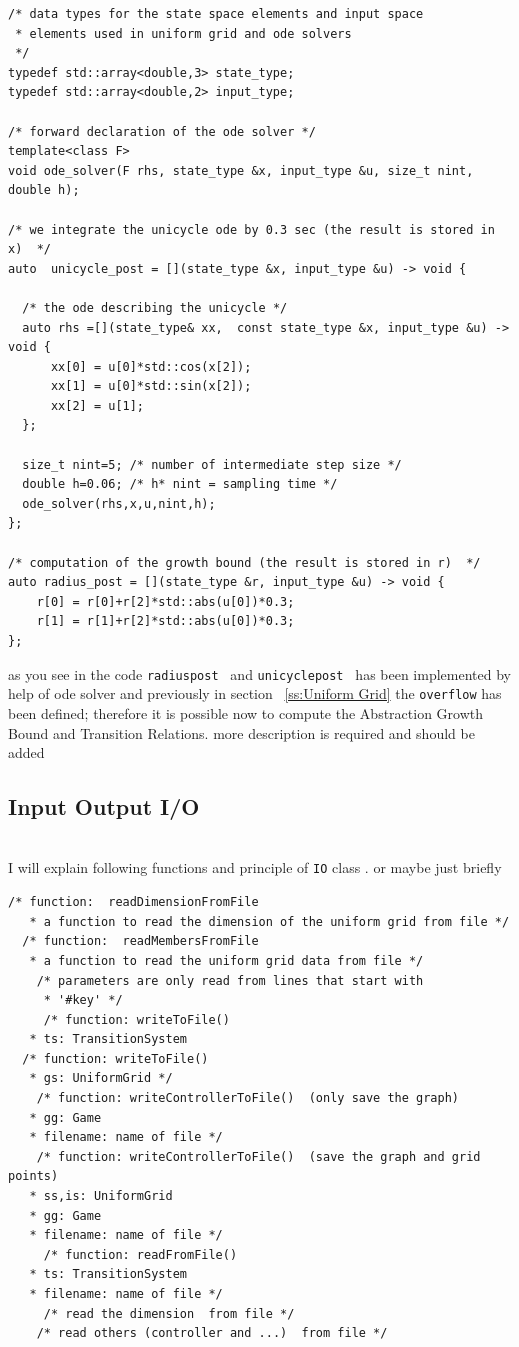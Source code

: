 \documentclass[a4paper]{amsart}
\begin{document}
\begin{lstlisting}[basicstyle=\footnotesize\ttfamily]
/* data types for the state space elements and input space
 * elements used in uniform grid and ode solvers 
 */
typedef std::array<double,3> state_type;
typedef std::array<double,2> input_type;

/* forward declaration of the ode solver */
template<class F>
void ode_solver(F rhs, state_type &x, input_type &u, size_t nint, double h);

/* we integrate the unicycle ode by 0.3 sec (the result is stored in x)  */
auto  unicycle_post = [](state_type &x, input_type &u) -> void {

  /* the ode describing the unicycle */
  auto rhs =[](state_type& xx,  const state_type &x, input_type &u) -> void {
      xx[0] = u[0]*std::cos(x[2]);
      xx[1] = u[0]*std::sin(x[2]);
      xx[2] = u[1];
  };

  size_t nint=5; /* number of intermediate step size */
  double h=0.06; /* h* nint = sampling time */
  ode_solver(rhs,x,u,nint,h);
};

/* computation of the growth bound (the result is stored in r)  */
auto radius_post = [](state_type &r, input_type &u) -> void {
    r[0] = r[0]+r[2]*std::abs(u[0])*0.3;
    r[1] = r[1]+r[2]*std::abs(u[0])*0.3;
};
\end{lstlisting}
as you see in the code 
{\tt\small radius\underline{\hspace{.07in}}post } and {\tt\small unicycle\underline{\hspace{.07in}}post } has been implemented by help of ode solver and previously in section  ~\ref{ss:Uniform Grid} the {\tt\small overflow} has been defined; therefore it is possible now to compute the Abstraction Growth Bound and Transition Relations.
{\color{red} more description is required and should be added}
~ \\
\subsection{Input Output I/O}
~ \\
{\color{red} I will explain following functions and principle of {\tt\small IO} class . or maybe just briefly}
\begin{lstlisting}[basicstyle=\footnotesize\ttfamily]
/* function:  readDimensionFromFile
   * a function to read the dimension of the uniform grid from file */
  /* function:  readMembersFromFile
   * a function to read the uniform grid data from file */
    /* parameters are only read from lines that start with
     * '#key' */
     /* function: writeToFile()
   * ts: TransitionSystem
  /* function: writeToFile()
   * gs: UniformGrid */
    /* function: writeControllerToFile()  (only save the graph)
   * gg: Game
   * filename: name of file */
    /* function: writeControllerToFile()  (save the graph and grid points)
   * ss,is: UniformGrid
   * gg: Game
   * filename: name of file */
     /* function: readFromFile()
   * ts: TransitionSystem
   * filename: name of file */
     /* read the dimension  from file */
    /* read others (controller and ...)  from file */
\end{lstlisting}
\end{document}
